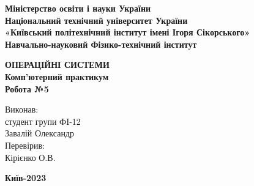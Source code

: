 \documentclass[a4paper,12pt]{article}
\begin{document}
    \pagestyle{fancy}
    \fancyhead{}
    \begin{center}
        \large{\textbf{Міністерство освіти і науки України\\
                Національний технічний університет України\\
                «Київський політехнічний інститут імені Ігоря Сікорського»\\
                Навчально-науковий Фізико-технічний інститут}}\\
        \hfill \break \hfill \break \hfill\break \hfill \break \hfill \break \hfill \break \hfill \break
        \hfill \break \hfill \break \hfill \break
        \begin{center}
            \normalsize{\textbf{ОПЕРАЦІЙНІ СИСТЕМИ\\
            Комп’ютерний практикум\\
            Робота №5}}
        \end{center}
    \end{center}
    \hfill \break \hfill \break \hfill \break \hfill \break \hfill \break \hfill \break \hfill \break
    \hfill \break \hfill \break \hfill \break \hfill \break 
    \begin{flushright}
        \large{ \hspace{35pt} Виконав:\\
            студент групи ФI-12\\
            Завалій Олександр\\} 
        \large{ \hspace{35pt} Перевірив:\\
        Кірієнко О.В.} 
    \end{flushright}
    \hfill \break \hfill \break \hfill \break \hfill \break \hfill \break \hfill \break \hfill \break
    \hfill \break
    \begin{center} \textbf{Київ-2023} \end{center}
    \thispagestyle{empty}
\end{document}
